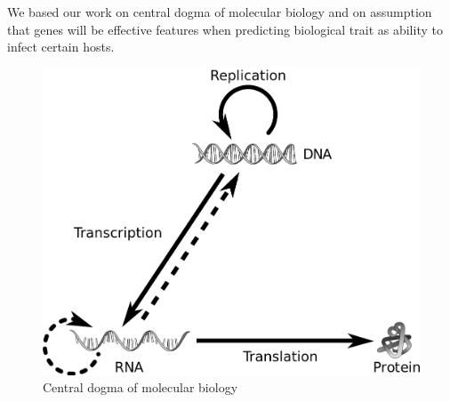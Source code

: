 We based our work on central dogma of molecular biology and on assumption that genes will be effective features when predicting biological trait as ability to infect certain hosts.

\begin{figure}[htp]
\includegraphics[width=\linewidth]{./images/central_dogma.png}
\centering
\caption{Central dogma of molecular biology}
\end{figure}


